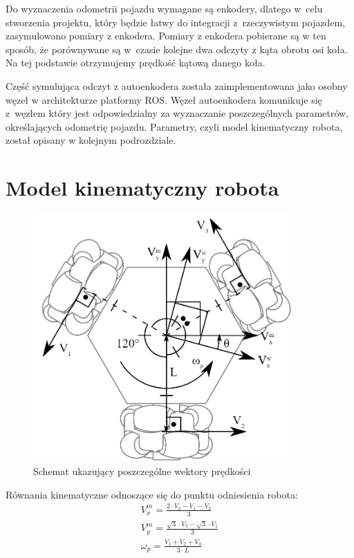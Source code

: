 Do wyznaczenia odometrii pojazdu wymagane są enkodery, dlatego w~celu
stworzenia projektu, który będzie łatwy do integracji z~rzeczywistym pojazdem,
zasymulowano pomiary z enkodera.
Pomiary z enkodera pobierane są w ten sposób, że porównywane są w~czasie
kolejne dwa odczyty z kąta obrotu osi koła.
Na tej podstawie otrzymujemy prędkość kątową danego koła.

Część symulująca odczyt z autoenkodera została zaimplementowana jako osobny
węzeł w architekturze platformy ROS.
Węzeł autoenkodera komunikuje się z~węzłem który jest odpowiedzialny za
wyznaczanie poszczególnych parametrów,
określających odometrię pojazdu.
Parametry, czyli model kinematyczny robota, został opisany w kolejnym
podrozdziale.

\section{Model kinematyczny robota}
\begin{figure}
  \centering
  \includegraphics[width=100mm]{graphics/omnischeme.png}
  \caption{Schemat ukazujący poszczególne wektory prędkości}
  \label{fig:forklift}
\end{figure}

Równania kinematyczne odnoszące się do punktu odniesienia robota:
\begin{gather*}
 V_x^m = \frac{2 \cdot V_2 - V_1 - V_3}{3} \\
 V_y^m = \frac{\sqrt{3} \cdot V_3 - \sqrt{3} \cdot V_1}{3} \\
 \omega_p = \frac{V_1 + V_2 + V_3}{3 \cdot L}
\end{gather*}

